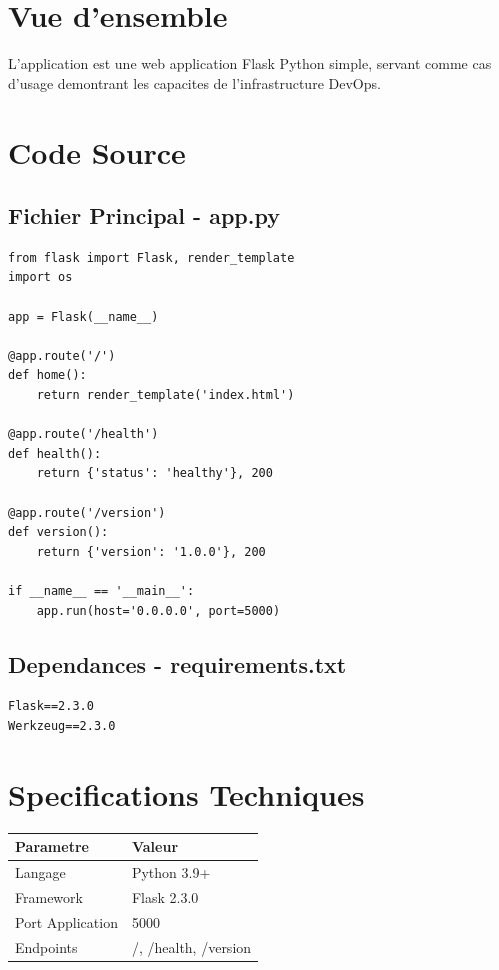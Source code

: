 \documentclass[12pt,a4paper]{report}
\begin{document}
\section{Vue d'ensemble}

L'application est une web application Flask Python simple, servant comme cas d'usage demontrant les capacites de l'infrastructure DevOps.

\section{Code Source}

\subsection{Fichier Principal - app.py}

\begin{lstlisting}
from flask import Flask, render_template
import os

app = Flask(__name__)

@app.route('/')
def home():
    return render_template('index.html')

@app.route('/health')
def health():
    return {'status': 'healthy'}, 200

@app.route('/version')
def version():
    return {'version': '1.0.0'}, 200

if __name__ == '__main__':
    app.run(host='0.0.0.0', port=5000)
\end{lstlisting}

\subsection{Dependances - requirements.txt}

\begin{lstlisting}
Flask==2.3.0
Werkzeug==2.3.0
\end{lstlisting}

\section{Specifications Techniques}

\begin{table}[H]
\centering
\begin{tabularx}{\linewidth}{|l|X|}
\hline
\textbf{Parametre} & \textbf{Valeur} \\
\hline
Langage & Python 3.9+ \\
Framework & Flask 2.3.0 \\
Port Application & 5000 \\
Endpoints & /, /health, /version \\
\hline
\end{tabularx}
\end{table}
\end{document}
